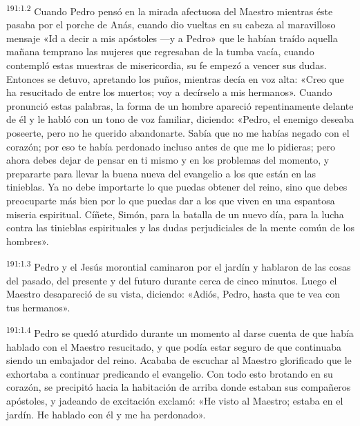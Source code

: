 \par 
\textsuperscript{191:1.2} Cuando Pedro pensó en la mirada afectuosa del Maestro mientras éste pasaba por el porche de Anás, cuando dio vueltas en su cabeza al maravilloso mensaje «Id a decir a mis apóstoles ---y a Pedro» que le habían traído aquella mañana temprano las mujeres que regresaban de la tumba vacía, cuando contempló estas muestras de misericordia, su fe empezó a vencer sus dudas. Entonces se detuvo, apretando los puños, mientras decía en voz alta: «Creo que ha resucitado de entre los muertos; voy a decírselo a mis hermanos». Cuando pronunció estas palabras, la forma de un hombre apareció repentinamente delante de él y le habló con un tono de voz familiar, diciendo: «Pedro, el enemigo deseaba poseerte, pero no he querido abandonarte. Sabía que no me habías negado con el corazón; por eso te había perdonado incluso antes de que me lo pidieras; pero ahora debes dejar de pensar en ti mismo y en los problemas del momento, y prepararte para llevar la buena nueva del evangelio a los que están en las tinieblas. Ya no debe importarte lo que puedas obtener del reino, sino que debes preocuparte más bien por lo que puedas dar a los que viven en una espantosa miseria espiritual. Cíñete, Simón, para la batalla de un nuevo día, para la lucha contra las tinieblas espirituales y las dudas perjudiciales de la mente común de los hombres».

\par 
\textsuperscript{191:1.3} Pedro y el Jesús morontial caminaron por el jardín y hablaron de las cosas del pasado, del presente y del futuro durante cerca de cinco minutos. Luego el Maestro desapareció de su vista, diciendo: «Adiós, Pedro, hasta que te vea con tus hermanos».

\par 
\textsuperscript{191:1.4} Pedro se quedó aturdido durante un momento al darse cuenta de que había hablado con el Maestro resucitado, y que podía estar seguro de que continuaba siendo un embajador del reino. Acababa de escuchar al Maestro glorificado que le exhortaba a continuar predicando el evangelio. Con todo esto brotando en su corazón, se precipitó hacia la habitación de arriba donde estaban sus compañeros apóstoles, y jadeando de excitación exclamó: «He visto al Maestro; estaba en el jardín. He hablado con él y me ha perdonado».

